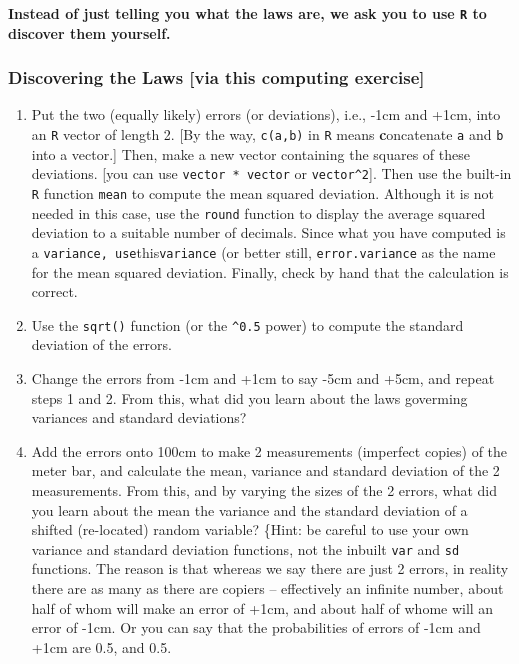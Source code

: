 \documentclass[]{book}
\begin{document}
\textbf{Instead of just telling you what the laws are, we ask you to use \texttt{R} to discover them yourself.}

\hypertarget{discovering-the-laws-via-this-computing-exercise}{%
\subsubsection{Discovering the Laws {[}via this computing exercise{]}}\label{discovering-the-laws-via-this-computing-exercise}}

\begin{enumerate}
\def\labelenumi{\arabic{enumi}.}
\item
  Put the two (equally likely) errors (or deviations), i.e., -1cm and +1cm, into an \texttt{R} vector of length 2. {[}By the way, \texttt{c(a,b)} in \texttt{R} means \textbf{c}oncatenate \texttt{a} and \texttt{b} into a vector.{]} Then, make a new vector containing the squares of these deviations. {[}you can use \texttt{vector\ *\ vector} or \texttt{vector\^{}2}{]}. Then use the built-in \texttt{R} function \texttt{mean} to compute the mean squared deviation. Although it is not needed in this case, use the \texttt{round} function to display the average squared deviation to a suitable number of decimals. Since what you have computed is a \texttt{variance\textquotesingle{},\ use}this\texttt{variance} (or better still, \texttt{error.variance} as the name for the mean squared deviation. Finally, check by hand that the calculation is correct.
\item
  Use the \texttt{sqrt()} function (or the \texttt{\^{}0.5} power) to compute the standard deviation of the errors.
\item
  Change the errors from -1cm and +1cm to say -5cm and +5cm, and repeat steps 1 and 2. From this, what did you learn about the laws goverming variances and standard deviations?
\item
  Add the errors onto 100cm to make 2 measurements (imperfect copies) of the meter bar, and calculate the mean, variance and standard deviation of the 2 measurements. From this, and by varying the sizes of the 2 errors, what did you learn about the mean the variance and the standard deviation of a shifted (re-located) random variable? \{Hint: be careful to use your own variance and standard deviation functions, not the inbuilt \texttt{var} and \texttt{sd} functions. The reason is that whereas we say there are just 2 errors, in reality there are as many as there are copiers -- effectively an infinite number, about half of whom will make an error of +1cm, and about half of whome will an error of -1cm. Or you can say that the probabilities of errors of -1cm and +1cm are 0.5, and 0.5.

\end{enumerate}
\end{document}
